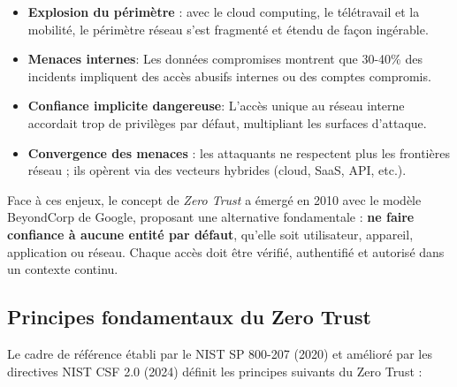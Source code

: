 \begin{itemize}
    \item \textbf{Explosion du périmètre} : avec le cloud computing, le télétravail et la mobilité, le périmètre réseau s'est fragmenté et étendu de façon ingérable.
    \item \textbf{Menaces internes}: Les données compromises montrent que 30-40\% des incidents impliquent des accès abusifs internes ou des comptes compromis.
    \item \textbf{Confiance implicite dangereuse}: L'accès unique au réseau interne accordait trop de privilèges par défaut, multipliant les surfaces d'attaque.
    \item \textbf{Convergence des menaces} : les attaquants ne respectent plus les frontières réseau ; ils opèrent via des vecteurs hybrides (cloud, SaaS, API, etc.).
\end{itemize}

Face à ces enjeux, le concept de \textit{Zero Trust} a émergé en 2010 avec le modèle BeyondCorp de Google, proposant une alternative fondamentale : \textbf{ne faire confiance à aucune entité par défaut}, qu'elle soit utilisateur, appareil, application ou réseau. Chaque accès doit être vérifié, authentifié et autorisé dans un contexte continu.

\subsection{Principes fondamentaux du Zero Trust}

Le cadre de référence établi par le NIST SP 800-207 (2020) et amélioré par les directives NIST CSF 2.0 (2024) définit les principes suivants du Zero Trust :

